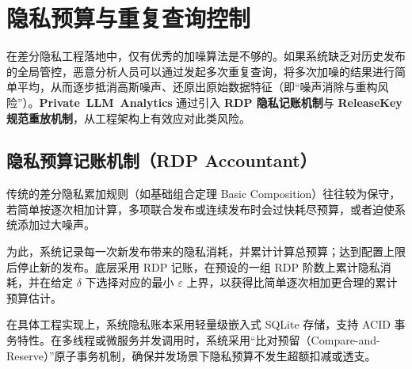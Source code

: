 \section{隐私预算与重复查询控制}
\label{sec:budget_and_replay}

在差分隐私工程落地中，仅有优秀的加噪算法是不够的。如果系统缺乏对历史发布的全局管控，恶意分析人员可以通过发起多次重复查询，将多次加噪的结果进行简单平均，从而逐步抵消高斯噪声、还原出原始数据特征（即“噪声消除与重构风险”）。\textbf{\mbox{Private LLM Analytics}} 通过引入 \textbf{RDP 隐私记账机制}与 \textbf{ReleaseKey 规范重放机制}，从工程架构上有效应对此类风险。

\subsection{隐私预算记账机制（RDP Accountant）}
传统的差分隐私累加规则（如基础组合定理 Basic Composition）往往较为保守，若简单按逐次相加计算，多项联合发布或连续发布时会过快耗尽预算，或者迫使系统添加过大噪声。

为此，系统记录每一次新发布带来的隐私消耗，并累计计算总预算；达到配置上限后停止新的发布。底层采用 RDP 记账，在预设的一组 RDP 阶数上累计隐私消耗，并在给定 $\delta$ 下选择对应的最小 $\varepsilon$ 上界，以获得比简单逐次相加更合理的累计预算估计。

在具体工程实现上，系统隐私账本采用轻量级嵌入式 SQLite 存储，支持 ACID 事务特性。在多线程或微服务并发调用时，系统采用“比对预留（Compare-and-Reserve）”原子事务机制，确保并发场景下隐私预算不发生超额扣减或透支。

